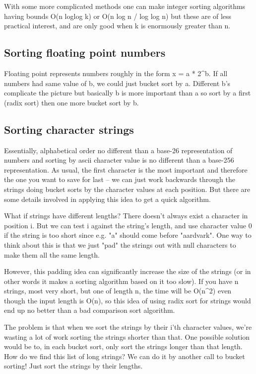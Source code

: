 \documentclass[a4paper,11pt]{article}
\begin{document}
With some more complicated methods one can make integer sorting
algorithms having bounds O(n loglog k) or O(n log n / log log n) but
these are of less practical interest, and are only good when k is
enormously greater than n.

\subsection{Sorting floating point numbers}

Floating point represents numbers roughly in the form x = a *
2\textasciicircum{}b.  If all numbers had same value of b, we could
just bucket sort by a.  Different b's complicate the picture but
basically b is more important than a so sort by a first (radix sort)
then one more bucket sort by b.


\subsection{Sorting character strings}

Essentially, alphabetical order no different than a base-26
representation of numbers and sorting by ascii character value is no
different than a base-256 representation. As usual, the first
character is the most important and therefore the one you want to save
for last -- we can just work backwards through the strings doing
bucket sorts by the character values at each position. But there are
some details involved in applying this idea to get a quick algorithm.


What if strings have different lengths? There doesn't always exist a
character in position i. But we can test i against the string's
length, and use character value 0 if the string is too short since
e.g. "a" should come before "aardvark". One way to think about this is
that we just "pad" the strings out with null characters to make them
all the same length.

However, this padding idea can significantly increase the size of the
strings (or in other words it makes a sorting algorithm based on it
too slow). If you have n strings, most very short, but one of length
n, the time will be O(n\textasciicircum{}2) even though the input
length is O(n), so this idea of using radix sort for strings would end
up no better than a bad comparison sort algorithm.

The problem is that when we sort the strings by their i'th character
values, we're wasting a lot of work sorting the strings shorter than
that. One possible solution would be to, in each bucket sort, only
sort the strings longer than that length. How do we find this list of
long strings? We can do it by another call to bucket sorting! Just
sort the strings by their lengths.
\end{document}
